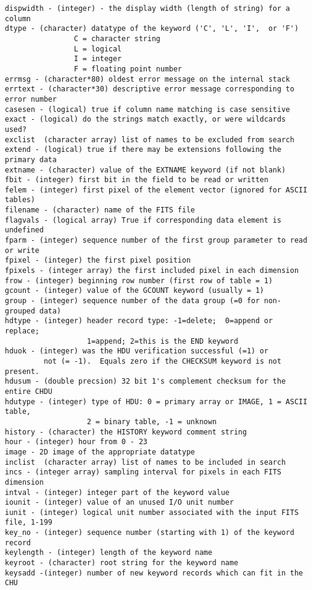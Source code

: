 \documentclass[11pt]{book}
\begin{document}
\begin{verbatim}
dispwidth - (integer) - the display width (length of string) for a column
dtype - (character) datatype of the keyword ('C', 'L', 'I',  or 'F')
                C = character string
                L = logical
                I = integer
                F = floating point number
errmsg - (character*80) oldest error message on the internal stack
errtext - (character*30) descriptive error message corresponding to error number
casesen - (logical) true if column name matching is case sensitive
exact - (logical) do the strings match exactly, or were wildcards used?
exclist  (character array) list of names to be excluded from search
extend - (logical) true if there may be extensions following the primary data
extname - (character) value of the EXTNAME keyword (if not blank)
fbit - (integer) first bit in the field to be read or written
felem - (integer) first pixel of the element vector (ignored for ASCII tables)
filename - (character) name of the FITS file
flagvals - (logical array) True if corresponding data element is undefined
fparm - (integer) sequence number of the first group parameter to read or write
fpixel - (integer) the first pixel position
fpixels - (integer array) the first included pixel in each dimension
frow - (integer) beginning row number (first row of table = 1)
gcount - (integer) value of the GCOUNT keyword (usually = 1)
group - (integer) sequence number of the data group (=0 for non-grouped data)
hdtype - (integer) header record type: -1=delete;  0=append or replace;
                   1=append; 2=this is the END keyword
hduok - (integer) was the HDU verification successful (=1) or
         not (= -1).  Equals zero if the CHECKSUM keyword is not present.
hdusum - (double precsion) 32 bit 1's complement checksum for the entire CHDU
hdutype - (integer) type of HDU: 0 = primary array or IMAGE, 1 = ASCII table,
                   2 = binary table, -1 = unknown
history - (character) the HISTORY keyword comment string
hour - (integer) hour from 0 - 23
image - 2D image of the appropriate datatype
inclist  (character array) list of names to be included in search
incs - (integer array) sampling interval for pixels in each FITS dimension
intval - (integer) integer part of the keyword value
iounit - (integer) value of an unused I/O unit number
iunit - (integer) logical unit number associated with the input FITS file, 1-199
key_no - (integer) sequence number (starting with 1) of the keyword record
keylength - (integer) length of the keyword name
keyroot - (character) root string for the keyword name
keysadd -(integer) number of new keyword records which can fit in the CHU

\end{verbatim}
\end{document}
